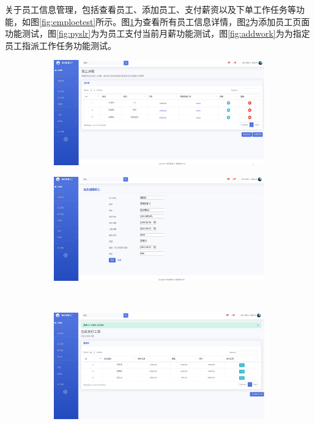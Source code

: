 关于员工信息管理，包括查看员工、添加员工、支付薪资以及下单工作任务等功能，如图\ref{fig:emploetest}所示。图\ref{fig:vuaemple}为查看所有员工信息详情，图\ref{fig:adnuemploe}为添加员工页面功能测试，图\ref{fig:pyslr}为为员工支付当前月薪功能测试，图\ref{fig:addwork}为为指定员工指派工作任务功能测试。

\begin{figure}[H]
    \centering
    \begin{subfigure}{.45\textwidth}
        \centering
        \includegraphics[width=\textwidth]{figures/6viewallemployee.png}
        \label{fig:vuaemple}
    \end{subfigure}
    \qquad
    \begin{subfigure}{.45\textwidth}
        \centering
        \includegraphics[width=\textwidth]{figures/6addnewemployee.png}
        \label{fig:adnuemploe}
    \end{subfigure}
    \\
    \begin{subfigure}{.45\textwidth}
        \centering
        \includegraphics[width=\textwidth]{figures/6paysalary.png}

\end{subfigure}
\end{figure}
